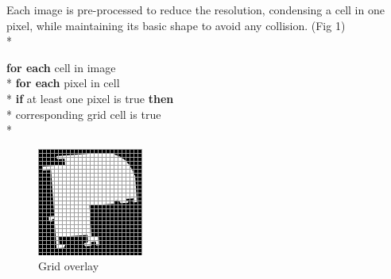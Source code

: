 \documentclass{article}
\begin{document}
	
	Each image is pre-processed to reduce the resolution, condensing a cell in one pixel, while maintaining its basic shape to avoid any collision. (Fig 1) \\*
	
	\begin{tabbing}
		\textbf{for each} cell in image \\*
		\kern 1pc \textbf{for each} pixel in cell\\*
		\kern 2pc \textbf{if} at least one pixel is true \textbf{then} \\*
		\kern 3pc corresponding grid cell is true \\*
	\end{tabbing}
	
	\begin{figure}[h]
		\centering
		\includegraphics[width=0.3\linewidth]{gridoverlay}
		\caption{Grid overlay}
	\end{figure}
	
\end{document}
